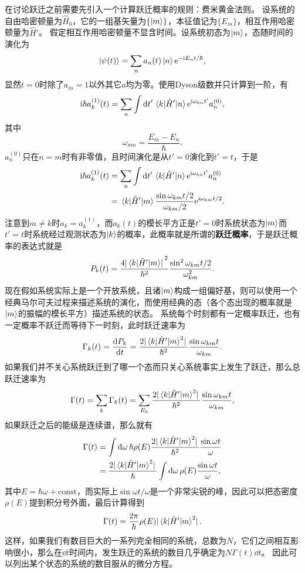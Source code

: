 \documentclass[UTF8, a4paper]{ctexart}
\newcommand*{\ii}{\mathrm{i}}
\newcommand*{\ee}{\mathrm{e}}
\newcommand*{\const}{\mathrm{const}}
\begin{document}
在讨论跃迁之前需要先引入一个计算跃迁概率的规则：费米黄金法则。
设系统的自由哈密顿量为$\hat{H}_0$，它的一组基矢量为$\{\ket{m}\}$，本征值记为$\{E_m\}$，相互作用哈密顿量为$\hat{H}'$。
假定相互作用哈密顿量不显含时间。设系统初态为$\ket{m}$，态随时间的演化为
\[
    \ket{\psi(t)} = \sum_n a_n(t) \ket{n} \ee^{- \ii E_n t / \hbar},
\]
显然$t=0$时除了$a_m=1$以外其它$a$均为零。使用Dyson级数并只计算到一阶，有
\[
    \ii \hbar a^{(1)}_k(t) = \sum_n \int \dd{t'} \mel{k}{\hat{H}'}{n} \ee^{\ii \omega_{kn} t'} a_n^{(0)},
\]
其中
\[
    \omega_{mn} = \frac{E_m - E_n}{\hbar}.
\]
$a_n^{(0)}$只在$n=m$时有非零值，且时间演化是从$t'=0$演化到$t'=t$，于是
\[
    \begin{aligned}
        \ii \hbar a^{(1)}_k(t) &= \sum_n \int \dd{t'} \mel{k}{\hat{H}'}{n} \ee^{\ii \omega_{kn} t'} a_n^{(0)} \\
        &= \mel{k}{\hat{H}'}{m} \frac{\sin \omega_{km} t / 2}{\omega_{km} / 2} \ee^{\ii \omega_{km} t / 2}. 
    \end{aligned}
\]
注意到$m \neq k$时$a_k = a_k^{(1)}$，而$a_k(t)$的模长平方正是$t'=0$时系统状态为$\ket{m}$而$t'=t$时系统经过观测状态为$\ket{k}$的概率，此概率就是所谓的\textbf{跃迁概率}，于是跃迁概率的表达式就是
\begin{equation}
    P_k(t) = \frac{4 \abs*{\mel{k}{\hat{H}'}{m}}^2}{\hbar^2} \frac{\sin^2 \omega_{km} t / 2}{\omega_{km}^2}.
\end{equation}
现在假如系统实际上是一个开放系统，且诸$\ket{m}$构成一组偏好基，则可以使用一个经典马尔可夫过程来描述系统的演化，而使用经典的态（各个态出现的概率就是$\ket{m}$的振幅的模长平方）描述系统的状态。
系统每个时刻都有一定概率跃迁，也有一定概率不跃迁而等待下一时刻，此时跃迁速率为
\begin{equation}
    \Gamma_k(t) = \dv{P_k}{t} = \frac{2 \abs*{\mel{k}{\hat{H}'}{m}^2}}{\hbar^2} \frac{\sin \omega_{km} t}{\omega_{km}}.
\end{equation}
如果我们并不关心系统跃迁到了哪一个态而只关心系统事实上发生了跃迁，那么总跃迁速率为
\[
    \Gamma(t) = \sum_k \Gamma_k(t) = \sum_{E_k} \frac{2 \abs*{\mel{k}{\hat{H}'}{m}^2}}{\hbar^2} \frac{\sin \omega_{km} t}{\omega_{km}},
\]
如果跃迁之后的能级是连续谱，那么就有
\[
    \begin{aligned}
        \Gamma(t) &= \int \dd{\omega} \hbar \rho(E) \frac{2 \abs*{\mel{k}{\hat{H}'}{m}^2}}{\hbar^2} \frac{\sin \omega t}{\omega} \\
        &= \frac{2 \abs*{\mel{k}{\hat{H}'}{m}^2}}{\hbar} \int \dd{\omega} \rho(E) \frac{\sin \omega t}{\omega}, 
    \end{aligned}
\]
其中$E = \hbar \omega + \const$，而实际上$\sin \omega t / \omega$是一个非常尖锐的峰，因此可以把态密度$\rho(E)$提到积分号外面，最后计算得到
\begin{equation}
    \Gamma(t) = \frac{2\pi}{\hbar} \rho(E) \abs*{\mel{k}{\hat{H}'}{m}^2}.
\end{equation}
这样，如果我们有数目巨大的一系列完全相同的系统，总数为$N$，它们之间相互影响很小，那么在$\dd{t}$时间内，发生跃迁的系统的数目几乎确定为$N \Gamma(t) \dd{t}$。
因此可以列出某个状态的系统的数目服从的微分方程。
\end{document}
